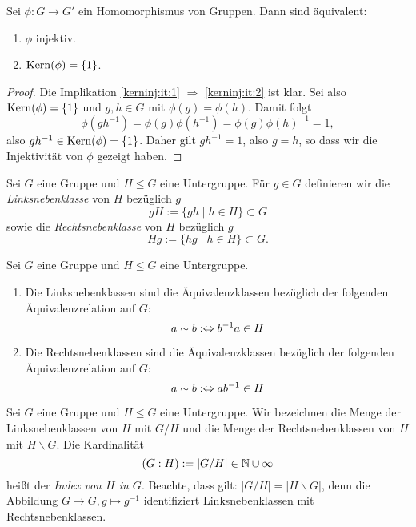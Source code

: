 \documentclass{book}
\begin{document}
\begin{prop}
    \label{prop:kerninj}
    Sei $\phi: G \to G'$ ein Homomorphismus von Gruppen. Dann sind äquivalent:
    \begin{enumerate}[label=(\roman*)]
        \item\label{kerninj:it:1} $\phi$ injektiv. 
        \item\label{kerninj:it:2} $\Kern(\phi) = \{1 \}$. 
    \end{enumerate}
\end{prop}
\begin{proof}
    Die Implikation \ref{kerninj:it:1} $\Rightarrow$ \ref{kerninj:it:2} ist klar. Sei also $\Kern(\phi) = \{1\}$ und $g,h \in G$ mit $\phi(g) = \phi(h)$. Damit folgt
    \[
        \phi(gh^{-1}) = \phi(g) \phi(h^{-1}) = \phi(g) \phi(h)^{-1} = 1, 
    \]
    also $gh^{-1} \in \Kern(\phi) = \{1 \}$. Daher gilt $gh^{-1} = 1$, also $g = h$, so dass wir die Injektivität von $\phi$ gezeigt haben.
\end{proof}

\begin{defi}
    \label{defi:neben}
    Sei $G$ eine Gruppe und $H \le G$ eine Untergruppe. Für $g \in G$
    definieren wir die \emph{Linksnebenklasse} von $H$ bezüglich $g$
    \[
        g H := \{g h \;|\; h \in H \} \subset G
    \]
    sowie die \emph{Rechtsnebenklasse} von $H$ bezüglich $g$
    \[
        H g := \{h g \;|\; h \in H \} \subset G.
    \]
\end{defi}

\begin{prob}
    \label{prob:neben} Sei $G$ eine Gruppe und $H \le G$ eine Untergruppe. 
    \begin{enumerate}
        \item Die Linksnebenklassen sind die Äquivalenzklassen bezüglich der folgenden Äquivalenzrelation auf $G$:
            \[
                a \sim b :\Leftrightarrow b^{-1}a \in H
            \]
        \item Die Rechtsnebenklassen sind die Äquivalenzklassen bezüglich der folgenden Äquivalenzrelation auf $G$:
            \[
                a \sim b :\Leftrightarrow ab^{-1} \in H
            \]
    \end{enumerate}
\end{prob}

\begin{term}
    \label{term:index} 
    Sei $G$ eine Gruppe und $H \le G$ eine Untergruppe. 
    Wir bezeichnen die Menge der Linksnebenklassen von $H$ mit $G/H$ und die
    Menge der Rechtsnebenklassen von $H$ mit $H \backslash G$. 
    Die Kardinalität
    \[
        (G:H) := |G/H| \in \mathbb{N} \cup {\infty}
    \]
    heißt der \emph{Index von $H$ in $G$}. Beachte, dass gilt: $|G/H| = |H \backslash
    G|$, denn die Abbildung $G \to G, g \mapsto g^{-1}$ identifiziert
    Linksnebenklassen mit Rechtsnebenklassen.
\end{term}
\end{document}
